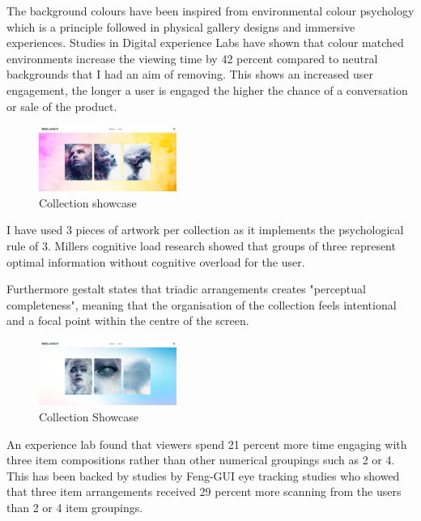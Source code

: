 \documentclass[]{project_final}
\begin{document}
The background colours have been inspired from environmental colour psychology which is a principle followed in physical gallery designs and immersive experiences. Studies in Digital experience Labs have shown that colour matched environments increase the viewing time by 42 percent compared to neutral backgrounds that I had an aim of removing. This shows an increased user engagement, the longer a user is engaged the higher the chance of a conversation or sale of the product.

\begin{figure}[ht!]
    \centering
    \includegraphics[width=0.4\textwidth]{AG13.png}
    \vspace*{0.0cm}
    \caption{Collection showcase}
    \label{fig:1}
\end{figure}

I have used 3 pieces of artwork per collection as it implements the psychological rule of 3. Millers cognitive load research showed that groups of three represent optimal information without cognitive overload for the user.

Furthermore gestalt states that triadic arrangements creates "perceptual completeness", meaning that the organisation of the collection feels intentional and a focal point within the centre of the screen.

\begin{figure}[ht!]
    \centering
    \includegraphics[width=0.4\textwidth]{AG14.png}
    \vspace*{0.0cm}
    \caption{Collection Showcase}
    \label{fig:1}
\end{figure}

An experience lab found that viewers spend 21 percent more time engaging with three item compositions rather than other numerical groupings such as 2 or 4. This has been backed by studies by Feng-GUI eye tracking studies who showed that three item arrangements received 29 percent more scanning from the users than 2 or 4 item groupings.
\end{document}
